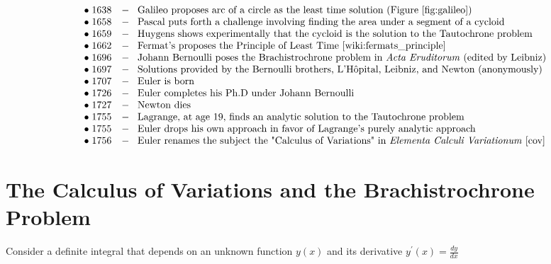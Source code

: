 \documentclass{article}
\theoremstyle{definition}
\begin{document}
\begin{equation*}
\begin{array}{lll}
&\bullet \; 1638  & - \;\;\; \text{Galileo proposes arc of a circle as the least time solution (Figure \ref{fig:galileo})}             \\
&\bullet \; 1658  & - \;\;\; \text{Pascal puts forth a challenge involving finding the area under a segment of a cycloid}              \\
&\bullet \; 1659  & - \;\;\; \text{Huygens shows experimentally that the cycloid is the solution to the Tautochrone problem}           \\
&\bullet \; 1662  & - \;\;\; \text{Fermat's proposes the Principle of Least Time \cite{wiki:fermats_principle}}                        \\
&\bullet \; 1696  & - \;\;\; \text{Johann Bernoulli poses the Brachistrochrone problem in \emph{Acta Eruditorum} (edited by Leibniz)}  \\
&\bullet \; 1697  & - \;\;\; \text{Solutions provided by the Bernoulli brothers, L'H\^{o}pital, Leibniz, and Newton (anonymously)}     \\
&\bullet \; 1707  & - \;\;\; \text{Euler is born}                                                                                      \\
&\bullet \; 1726  & - \;\;\; \text{Euler completes his Ph.D under Johann Bernoulli}                                                    \\
&\bullet \; 1727  & - \;\;\; \text{Newton dies}                                                                                        \\
&\bullet \; 1755  & - \;\;\; \text{Lagrange, at age 19, finds an analytic solution to the Tautochrone problem}                         \\
&\bullet \; 1755  & - \;\;\; \text{Euler drops his own approach in favor of Lagrange's purely analytic approach}                       \\
&\bullet \; 1756  & - \;\;\; \text{Euler renames the subject the "Calculus of Variations" in \emph{Elementa Calculi Variationum} \cite{cov}}
\end{array}
\end{equation*}

\medskip
\section{The Calculus of Variations and the Brachistrochrone Problem}
\label{sec:cov}
Consider a definite integral that depends on an unknown function $y(x)$ and its derivative 
$y^{\prime}(x) = \frac{dy}{dx}$
\end{document}
